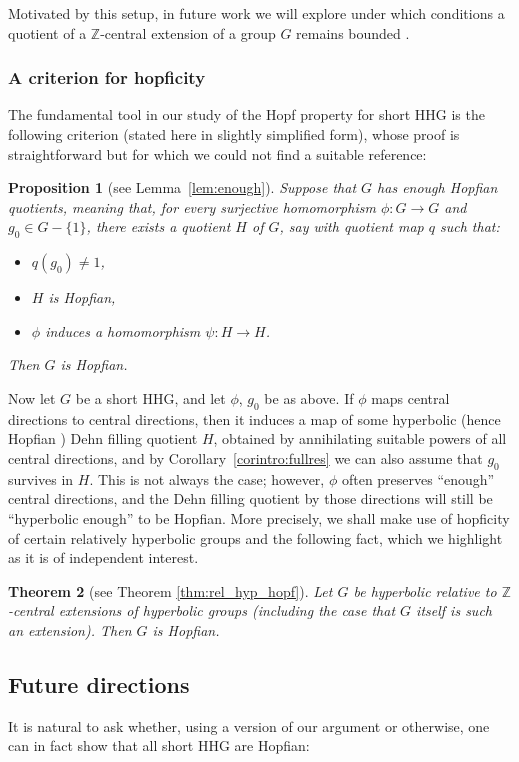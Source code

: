 \documentclass[svgnames]{amsart}
\theoremstyle{plain}
\newtheorem{thmintro}{Theorem}
\newtheorem{propintro}[thmintro]{Proposition}
\theoremstyle{definition}
\newcommand{\Z}{\mathbb{Z}}
\begin{document}
Motivated by this setup, in future work we will explore under which conditions a quotient of a $\Z$-central extension of a group $G$ remains bounded \cite{inpreparation}.

\subsubsection*{A criterion for hopficity}
The fundamental tool in our study of the Hopf property for short HHG is the following criterion (stated here in slightly simplified form), whose proof is straightforward but for which we could not find a suitable reference:
\begin{propintro}[{see Lemma~\ref{lem:enough}}]
Suppose that $G$ has \emph{enough Hopfian quotients}, meaning that, for every surjective homomorphism $\phi: G\to G$ and $g_0\in G-\{1\}$, there exists a quotient $H$ of $G$, say with quotient map $q$ such that:
\begin{itemize}
 \item $q(g_0)\neq 1$,
 \item $H$ is Hopfian,
 \item $\phi$ induces a homomorphism $\psi\colon H\to H$.
\end{itemize}
Then $G$ is Hopfian.
\end{propintro}

Now let $G$ be a short HHG, and let $\phi$, $g_0$ be as above. If $\phi$ maps central directions to central directions, then it induces a map of some hyperbolic (hence Hopfian \cite[Corollary 6.13]{ReinfeldWeidmann}) Dehn filling quotient $H$, obtained by annihilating suitable powers of all central directions, and by Corollary~\ref{corintro:fullres} we can also assume that $g_0$ survives in $H$. This is not always the case; however, $\phi$ often preserves “enough” central directions, and the Dehn filling quotient by those directions will still be “hyperbolic enough” to be Hopfian. More precisely, we shall make use of hopficity of certain relatively hyperbolic groups \cite{Groves_Hull:eq_noetherian} and the following fact, which we highlight as it is of independent interest.
\begin{thmintro}[{see Theorem \ref{thm:rel_hyp_hopf}}]
Let $G$ be hyperbolic relative to $\Z$-central extensions of hyperbolic groups (including the case that $G$ itself is such an extension). Then $G$ is Hopfian.
\end{thmintro}


\subsection*{Future directions}
It is natural to ask whether, using a version of our argument or otherwise, one can in fact show that all short HHG are Hopfian:
\end{document}
